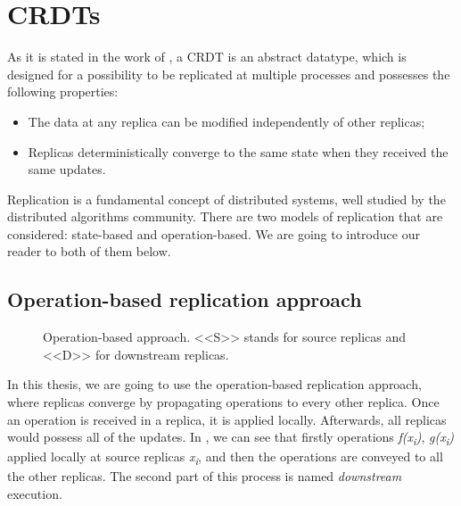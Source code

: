 \section{CRDTs}
\label{2-crdts}

As it is stated in the work of \citet{3}, a CRDT is an abstract datatype, which is designed for a possibility to be replicated at multiple processes and possesses the following properties:


    \begin{itemize}
        \item {The data at any replica can be modified independently of other replicas;}
        \item {Replicas deterministically converge to the same state when they received the same updates.}
    \end{itemize}

Replication is a fundamental concept of distributed systems, well studied by the distributed algorithms community\cite{2}. There are two models of replication that are considered: state-based and operation-based. We are going to introduce our reader to both of them below. 

\subsection*{Operation-based replication approach}

\begin{figure}[!htb]
    \begin{center}
    \def\svgwidth{\linewidth}
    
    \caption {Operation-based approach\cite{2}. <<S>> stands for source replicas and <<D>> for downstream replicas. }
    \label{fig:theory1}
\end{center}
\end{figure}

In this thesis, we are going to use the operation-based replication approach, where replicas converge by propagating operations to every other replica\cite{3}. Once an operation is received in a replica, it is applied locally. Afterwards, all replicas would possess all of the updates. In , we can see that firstly operations \textit{f(x\textsubscript{i})}, \textit{g(x\textsubscript{i})} applied locally at source replicas \textit{x\textsubscript{i}}, and then the operations are conveyed to all the other replicas. The second part of this process is named \textit{downstream} execution.

